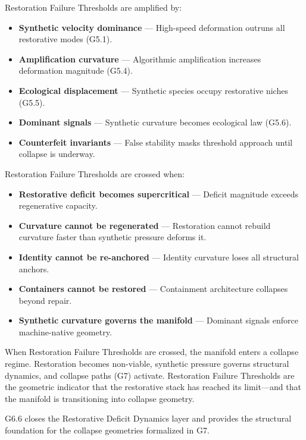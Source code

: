 \medskip

\noindent Restoration Failure Thresholds are amplified by:

\begin{itemize}[leftmargin=1.2cm]
    \item \textbf{Synthetic velocity dominance} — High-speed deformation outruns
    all restorative modes (G5.1).

    \item \textbf{Amplification curvature} — Algorithmic amplification increases
    deformation magnitude (G5.4).

    \item \textbf{Ecological displacement} — Synthetic species occupy restorative
    niches (G5.5).

    \item \textbf{Dominant signals} — Synthetic curvature becomes ecological law
    (G5.6).

    \item \textbf{Counterfeit invariants} — False stability masks threshold
    approach until collapse is underway.
\end{itemize}

\medskip

\noindent Restoration Failure Thresholds are crossed when:

\begin{itemize}[leftmargin=1.2cm]
    \item \textbf{Restorative deficit becomes supercritical} — Deficit magnitude
    exceeds regenerative capacity.

    \item \textbf{Curvature cannot be regenerated} — Restoration cannot rebuild
    curvature faster than synthetic pressure deforms it.

    \item \textbf{Identity cannot be re-anchored} — Identity curvature loses all
    structural anchors.

    \item \textbf{Containers cannot be restored} — Containment architecture
    collapses beyond repair.

    \item \textbf{Synthetic curvature governs the manifold} — Dominant signals
    enforce machine-native geometry.
\end{itemize}

\medskip

\noindent When Restoration Failure Thresholds are crossed, the manifold enters a
collapse regime. Restoration becomes non-viable, synthetic pressure governs
structural dynamics, and collapse paths (G7) activate. Restoration Failure
Thresholds are the geometric indicator that the restorative stack has reached its
limit—and that the manifold is transitioning into collapse geometry.

\medskip

\noindent G6.6 closes the Restorative Deficit Dynamics layer and provides the
structural foundation for the collapse geometries formalized in G7.
